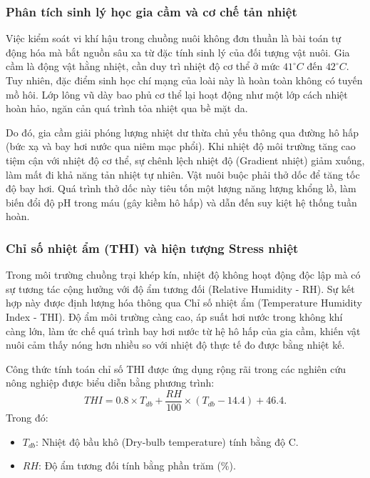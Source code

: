 \subsubsection{Phân tích sinh lý học gia cầm và cơ chế tản nhiệt}
Việc kiểm soát vi khí hậu trong chuồng nuôi không đơn thuần là bài toán tự động hóa mà bắt nguồn sâu xa từ đặc tính sinh lý của đối tượng vật nuôi. Gia cầm là động vật hằng nhiệt, cần duy trì nhiệt độ cơ thể ở mức $41^\circ C$ đến $42^\circ C$. Tuy nhiên, đặc điểm sinh học chí mạng của loài này là hoàn toàn không có tuyến mồ hôi. Lớp lông vũ dày bao phủ cơ thể lại hoạt động như một lớp cách nhiệt hoàn hảo, ngăn cản quá trình tỏa nhiệt qua bề mặt da.

Do đó, gia cầm giải phóng lượng nhiệt dư thừa chủ yếu thông qua đường hô hấp (bức xạ và bay hơi nước qua niêm mạc phổi). Khi nhiệt độ môi trường tăng cao tiệm cận với nhiệt độ cơ thể, sự chênh lệch nhiệt độ (Gradient nhiệt) giảm xuống, làm mất đi khả năng tản nhiệt tự nhiên. Vật nuôi buộc phải thở dốc để tăng tốc độ bay hơi. Quá trình thở dốc này tiêu tốn một lượng năng lượng khổng lồ, làm biến đổi độ pH trong máu (gây kiềm hô hấp) và dẫn đến suy kiệt hệ thống tuần hoàn.

\subsubsection{Chỉ số nhiệt ẩm (THI) và hiện tượng Stress nhiệt}
Trong môi trường chuồng trại khép kín, nhiệt độ không hoạt động độc lập mà có sự tương tác cộng hưởng với độ ẩm tương đối (Relative Humidity - RH). Sự kết hợp này được định lượng hóa thông qua Chỉ số nhiệt ẩm (Temperature Humidity Index - THI). Độ ẩm môi trường càng cao, áp suất hơi nước trong không khí càng lớn, làm ức chế quá trình bay hơi nước từ hệ hô hấp của gia cầm, khiến vật nuôi cảm thấy nóng hơn nhiều so với nhiệt độ thực tế đo được bằng nhiệt kế.

Công thức tính toán chỉ số THI \cite{thom1959discomfort, lin2006thermal} được ứng dụng rộng rãi trong các nghiên cứu nông nghiệp được biểu diễn bằng phương trình:
\begin{equation}
    {THI = 0.8 \times T_{db} + \frac{RH}{100} \times (T_{db} - 14.4) + 46.4}.
\end{equation}
Trong đó:
\begin{itemize}
    \item $T_{db}$: Nhiệt độ bầu khô (Dry-bulb temperature) tính bằng độ C.
    \item $RH$: Độ ẩm tương đối tính bằng phần trăm (\%).
\end{itemize}

